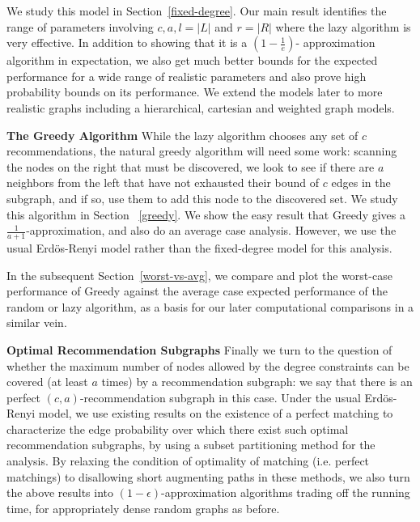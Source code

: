 We study this model in Section~\ref{fixed-degree}. Our main result
identifies the range of parameters involving $c,a,l=|L|$ and $r =|R|$
where the lazy algorithm is very effective. In addition to showing
that it is a $(1-\frac1e)$- approximation algorithm in expectation, we
also get much better bounds for the expected performance for a wide
range of realistic parameters and also prove high probability bounds
on its performance. We extend the models later to more realistic
graphs including a hierarchical, cartesian and weighted graph
models. \vs

{\bf The Greedy Algorithm}
While the lazy algorithm chooses any set of $c$ recommendations, the natural
greedy algorithm will need some work: scanning the nodes on the right that must
be discovered, we look to see if there are $a$ neighbors from the left that have
not exhausted their bound of $c$ edges in the subgraph, and if so, use them to
add this node to the discovered set. We study this algorithm in Section
~\ref{greedy}. We show the easy result that Greedy gives a 
$\frac{1}{a+1}$-approximation, and also do an average case analysis. However, we
use the usual Erd\"os-Renyi model \cite{ErdosRenyi59}
rather than the fixed-degree model for this analysis.

In the subsequent Section~\ref{worst-vs-avg}, we compare and plot the worst-case
performance of Greedy against the average case expected performance of the random
or lazy algorithm, as a basis for our later computational comparisons in a
similar vein. \vs

{\bf Optimal Recommendation Subgraphs}
Finally we turn to the question of whether the maximum number of nodes allowed
by the degree constraints can be covered (at least $a$ times) by a recommendation
subgraph: we say that there is an perfect $(c,a)$-recommendation subgraph in this
case. Under the usual Erd\"os-Renyi model, we use existing results on the
existence of a perfect matching to characterize the edge probability over which
there exist such optimal recommendation subgraphs, by using a subset partitioning
method for the analysis. By relaxing the condition of optimality of matching (i.e.
perfect matchings) to disallowing short augmenting paths in these methods, we also
turn the above results into $(1-\epsilon)$-approximation algorithms trading off
the running time, for appropriately dense random graphs as before. \vs
